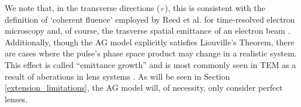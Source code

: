We note that, in the transverse directions (${\scriptscriptstyle T}$), this is consistent with the definition of `coherent fluence' employed by Reed et al.\cite{reed_evolution_2009} for time-resolved electron microscopy and, of course, the trasverse spatial emittance of an electron beam \cite{jensen_theoretical_2006,siwick_ultrafast_2002}.
Additionally, though the AG model explicitly satisfies Liouville's Theorem, there are cases where the pulse's phase space product may change in a realistic system.
This effect is called ``emittance growth'' and is most commonly seen in TEM as a result of aberations in lens systems \cite{oshea_reversible_1998}.
As will be seen in Section \ref{extension_limitations}, the AG model will, of necessity, only consider perfect lenses.

